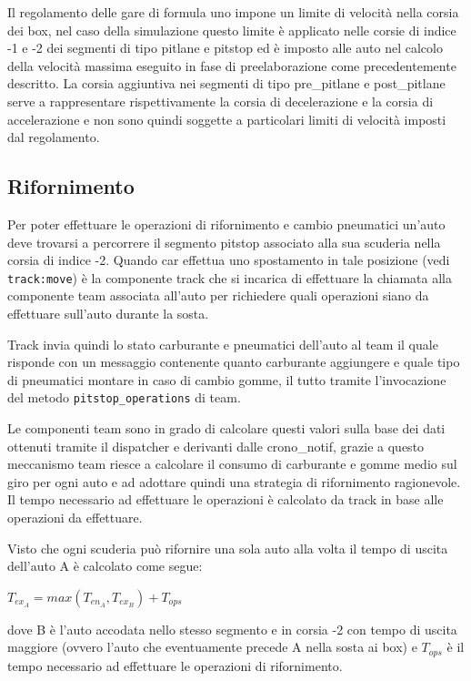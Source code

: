 \documentclass[11pt,a4paper]{report}
\newcommand{\fun}[1]{\texttt{#1}}
\begin{document}
Il regolamento delle gare di formula uno impone un limite di velocità nella corsia dei box, nel caso della simulazione questo limite è applicato nelle corsie di indice -1 e -2 dei segmenti di tipo pitlane e pitstop ed è imposto alle auto nel calcolo della velocità massima eseguito in fase di preelaborazione come precedentemente descritto.
La corsia aggiuntiva nei segmenti di tipo pre\_pitlane e post\_pitlane serve a rappresentare rispettivamente la corsia di decelerazione e la corsia di accelerazione e non sono quindi soggette a particolari limiti di velocità imposti dal regolamento.

\subsection{Rifornimento}
\label{txt:rifornimento}
Per poter effettuare le operazioni di rifornimento e cambio pneumatici un'auto deve trovarsi a percorrere il segmento pitstop associato alla sua scuderia nella corsia di indice -2. Quando car effettua uno spostamento in tale posizione (vedi \fun{track:move}) è la componente track che si incarica di effettuare la chiamata alla componente team associata all'auto per richiedere quali operazioni siano da effettuare sull'auto durante la sosta.

Track invia quindi lo stato carburante e pneumatici dell'auto al team il quale risponde con un messaggio contenente quanto carburante aggiungere e quale tipo di pneumatici montare in caso di cambio gomme, il tutto tramite l'invocazione del metodo \fun{pitstop\_operations} di team.

Le componenti team sono in grado di calcolare questi valori sulla base dei dati ottenuti tramite il dispatcher e derivanti dalle crono\_notif, grazie a questo meccanismo team riesce a calcolare il consumo di carburante e gomme medio sul giro per ogni auto e ad adottare quindi una strategia di rifornimento ragionevole.
Il tempo necessario ad effettuare le operazioni è calcolato da track in base alle operazioni da effettuare.

Visto che ogni scuderia può rifornire una sola auto alla volta il tempo di uscita dell'auto A è calcolato come segue:
\begin{center}
$T_{ex_A} = max(T_{en_A}, T_{ex_B}) + T_{ops}$
\end{center}
dove B è l'auto accodata nello stesso segmento e in corsia -2 con tempo di uscita maggiore (ovvero l'auto che eventuamente precede A nella sosta ai box) e $T_{ops}$ è il tempo necessario ad effettuare le operazioni di rifornimento.
\end{document}
